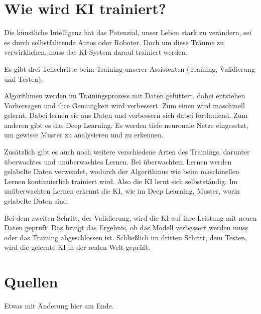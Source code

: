 \documentclass{article}
\begin{document}
\citep{ostfalia-de}



\section{Wie wird KI trainiert?}

Die künstliche Intelligenz hat das Potenzial, unser Leben stark zu verändern, sei es durch selbstfahrende Autos oder Roboter. Doch um diese Träume zu verwirklichen, muss das KI-System darauf trainiert werden.

\vspace{2mm}Es gibt drei Teilschritte beim Training unserer Assistenten (Training, Validierung und Testen). 

\vspace{2mm}Algorithmen werden im Trainingsprozess mit Daten gefüttert, dabei entstehen Vorhersagen und ihre Genauigkeit wird verbessert. Zum einen wird maschinell gelernt. Dabei lernen sie aus Daten und verbessern sich dabei fortlaufend. Zum anderen gibt es das Deep Learning. Es werden tiefe neuronale Netze eingesetzt, um gewisse Muster zu analysieren und zu erkennen.

\vspace{2mm}Zusätzlich gibt es auch noch weitere verschiedene Arten des Trainings, darunter überwachtes und unüberwachtes Lernen. Bei überwachtem Lernen werden gelabelte Daten verwendet, wodurch der Algorithmus wie beim maschinellen Lernen kontinuierlich trainiert wird. Also die KI lernt sich selbstständig. Im unüberwachten Lernen erkennt die KI, wie im Deep Learning, Muster, worin gelabelte Daten sind.

\vspace{2mm}Bei dem zweiten Schritt, der Validierung, wird die KI auf ihre Leistung mit neuen Daten geprüft. Das bringt das Ergebnis, ob das Modell verbessert werden muss oder das Training abgeschlossen ist. Schließlich im dritten Schritt, dem Testen, wird die gelernte KI in der realen Welt geprüft.

\citep{clickworker-de}







\section{Quellen}

Etwas mit Änderung hier am Ende.

\printbibliography
\end{document}

